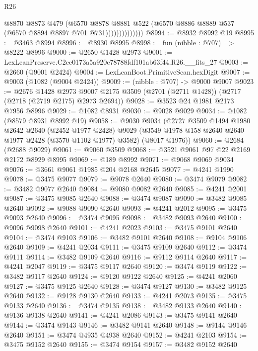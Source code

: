 \begin{lexlean}{R26}
\begin{coremodule}
                          @8870
                          @8873
                          @479
                          (@6570
                            @8878
                            @8881
                            @522
                            (@6570 @8886 @8889 @537 (@6570 @8894 @8897 @701 @731))))))))))))))
@8994 := @8932 @8992 @19
@8995 := @3463 @8994
@8996 := @8930 @8995
@8998 := fun (nibble : @707) => @8222 @8996
@9000 := @2650 @1428 @2973
@9001 := LexLeanPreserve.C2ee0173a5a920c78788fdf101ab63f44.R26.__fits_27
@9003 := @2660 (@9001 @2424)
@9004 := LexLeanBoot.PrimitiveScan.hexDigit
@9007 := @9003 (@1082 (@9004 @2424))
@9009 := (nibble : @707) -> @9000 @9007
@9023 := @2676
    @1428
    @2973
    @9007
    @2175
    @3509
    (@2701 (@2711 @1428))
    (@2717 (@2718 (@2719 @2175) @2973 @2694))
@9028 := @3523 @24 @1981 @2173 @7956 @8996
@9029 := @1082 @8931
@9030 := @9028 @9029
@9034 := @1082 (@8579 @8931 @8992 @19)
@9058 := @9030
    @9034
    (@2727
      @3509
      @1494
      @1980
      @2642
      @2640
      (@2452 @1977 @2428)
      @9029
      (@3549 @1978 @158 @2640 @2640 @1977 @2428 (@3570 @1102 @1977) @3582)
      (@8017 @1976))
@9060 := @2684 (@2688 @9029)
@9061 := @9060 @3509
@9068 := @3521 @9061 @97 @22 @2169 @2172 @8929 @8995
@9069 := @189 @8992
@9071 := @9068 @9069 @9034
@9076 := @3661 @9061 @1985 @204 @2168 @2645
@9077 := @4241 @1990
@9078 := @3475 @9077
@9079 := @9078 @2640
@9080 := @3474 @9079
@9082 := @3482 @9077 @2640
@9084 := @9080 @9082 @2640
@9085 := @4241 @2001
@9087 := @3475 @9085 @2640
@9088 := @3474 @9087
@9090 := @3482 @9085 @2640
@9092 := @9088 @9090 @2640
@9093 := @4241 @2012
@9095 := @3475 @9093 @2640
@9096 := @3474 @9095
@9098 := @3482 @9093 @2640
@9100 := @9096 @9098 @2640
@9101 := @4241 @2023
@9103 := @3475 @9101 @2640
@9104 := @3474 @9103
@9106 := @3482 @9101 @2640
@9108 := @9104 @9106 @2640
@9109 := @4241 @2034
@9111 := @3475 @9109 @2640
@9112 := @3474 @9111
@9114 := @3482 @9109 @2640
@9116 := @9112 @9114 @2640
@9117 := @4241 @2047
@9119 := @3475 @9117 @2640
@9120 := @3474 @9119
@9122 := @3482 @9117 @2640
@9124 := @9120 @9122 @2640
@9125 := @4241 @2060
@9127 := @3475 @9125 @2640
@9128 := @3474 @9127
@9130 := @3482 @9125 @2640
@9132 := @9128 @9130 @2640
@9133 := @4241 @2073
@9135 := @3475 @9133 @2640
@9136 := @3474 @9135
@9138 := @3482 @9133 @2640
@9140 := @9136 @9138 @2640
@9141 := @4241 @2086
@9143 := @3475 @9141 @2640
@9144 := @3474 @9143
@9146 := @3482 @9141 @2640
@9148 := @9144 @9146 @2640
@9151 := @3474 @4935 @4938 @2640
@9152 := @4241 @2103
@9154 := @3475 @9152 @2640
@9155 := @3474 @9154
@9157 := @3482 @9152 @2640

\end{coremodule}
\end{lexlean}
